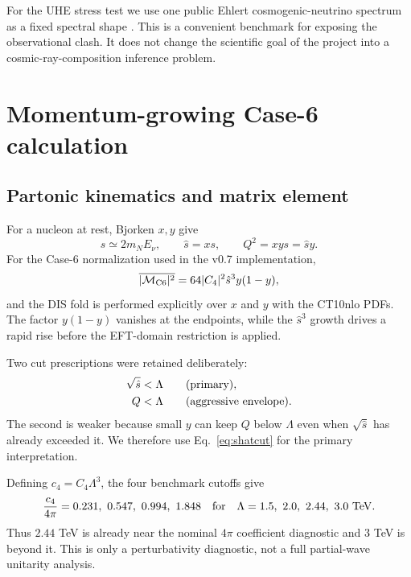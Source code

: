 \documentclass[11pt,a4paper]{article}
\begin{document}
For the UHE stress test we use one public Ehlert cosmogenic-neutrino spectrum
as a fixed spectral shape \cite{Ehlert:2024}.  This is a convenient benchmark
for exposing the observational clash.  It does not change the scientific goal
of the project into a cosmic-ray-composition inference problem.

\section{Momentum-growing Case-6 calculation}
\subsection{Partonic kinematics and matrix element}
For a nucleon at rest, Bjorken $x,y$ give
\begin{equation}
 s\simeq2m_NE_\nu,\qquad \hat s=xs,
 \qquad Q^2=xys=\hat s y.
 \label{eq:kin}
\end{equation}
For the Case-6 normalization used in the v0.7 implementation,
\begin{equation}
 \overline{|{\cal M}_{\rm C6}|^2}
 =64 |C_4|^2\hat s^3 y(1-y),
 \label{eq:M2}
\end{equation}
and the DIS fold is performed explicitly over $x$ and $y$ with the CT10nlo
PDFs.  The factor $y(1-y)$ vanishes at the endpoints, while the $\hat s^3$
growth drives a rapid rise before the EFT-domain restriction is applied.

Two cut prescriptions were retained deliberately:
\begin{align}
 \sqrt{\hat s}<\Lambda &\qquad {\rm(primary)},
 \label{eq:shatcut}\\
 Q<\Lambda &\qquad {\rm(aggressive\ envelope)}.
 \label{eq:Qcut}
\end{align}
The second is weaker because small $y$ can keep $Q$ below $\Lambda$ even when
$\sqrt{\hat s}$ has already exceeded it.  We therefore use
Eq.~\eqref{eq:shatcut} for the primary interpretation.

Defining $c_4=C_4\Lambda^3$, the four benchmark cutoffs give
\begin{equation}
 {c_4\over4\pi}=0.231,\ 0.547,\ 0.994,\ 1.848
 \quad {\rm for}\quad
 \Lambda=1.5,\ 2.0,\ 2.44,\ 3.0\ {\rm TeV}.
 \label{eq:c4pert}
\end{equation}
Thus $2.44$ TeV is already near the nominal $4\pi$ coefficient diagnostic and
$3$ TeV is beyond it.  This is only a perturbativity diagnostic, not a full
partial-wave unitarity analysis.
\end{document}
